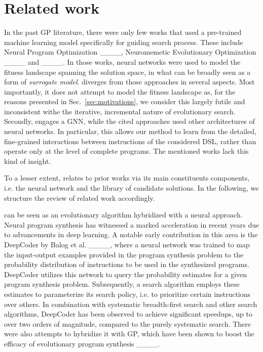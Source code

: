 \section{Related work}
\label{sec:related}

In the past GP literature, there were only few works that used a pre-trained machine learning model specifically for guiding search process. These include Neural Program Optimization ____, Neuromemetic Evolutionary Optimization ____ and ____. In those works, neural networks were used to model the fitness landscape spanning the solution space, in what can be broadly seen as a form of \emph{surrogate model}. \mname diverges from those approaches in several aspects. Most importantly, it does not attempt to model the fitness landscape as, for the reasons presented in Sec.\ \ref{sec:motivations}, we consider this largely futile and inconsistent withe the iterative, incremental nature of  evolutionary search. Secondly, \mname engages a GNN, while the cited approaches used other architectures of neural networks. In particular, this allows our method to learn from the detailed, fine-grained interactions between instructions of the considered DSL, rather than operate only at the level of complete programs. The mentioned works lack this kind of insight. 

To a lesser extent, \mname relates to prior works via its main constituents components, i.e. the neural network and the library of candidate solutions. In the following, we structure the review of related work accordingly.   

\mname can be seen as an evolutionary algorithm hybridized with a neural approach. Neural program synthesis has witnessed a marked acceleration in recent years due to advancements in deep learning. A notable early contribution in this area is the DeepCoder by Balog et al. ____, where a neural network was trained to map the input-output examples provided in the program synthesis problem to the probability distribution of instructions to be used in the synthesized programs. DeepCoder utilizes this network to query the probability estimates for a given program synthesis problem. Subsequently, a search algorithm employs these estimates to parameterize its search policy, i.e. to prioritize certain instructions over others. In combination with systematic breadth-first search and other search algorithms, DeepCoder has been observed to achieve significant speedups, up to over two orders of magnitude, compared to the purely systematic search. There were also attempts to hybridize it with GP, which have been shown to boost the efficacy of evolutionary program synthesis ____. 



